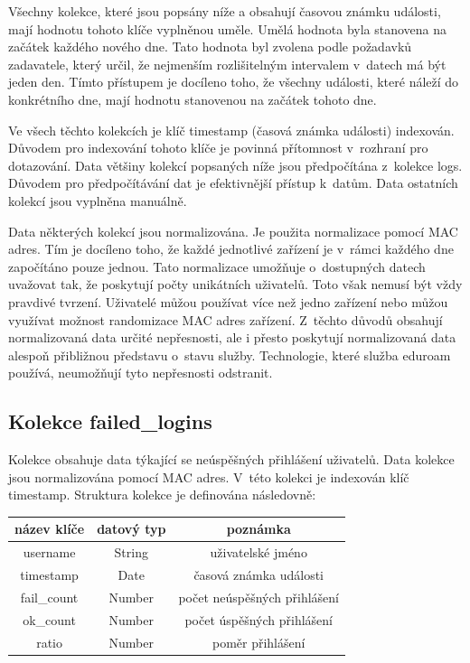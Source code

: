 \documentclass[thesis=M,czech]{FITthesis}[2012/06/26]
\begin{document}
    Všechny kolekce, které jsou popsány níže a obsahují časovou známku události,
    mají hodnotu tohoto klíče vyplněnou uměle. 
    Umělá hodnota byla stanovena na začátek každého nového dne.
    Tato hodnota byl zvolena podle požadavků zadavatele, který určil, že
    nejmenším rozlišitelným intervalem v~datech má být jeden den.
    Tímto přístupem je docíleno toho, že všechny události,
    které náleží do konkrétního dne, mají hodnotu stanovenou na začátek tohoto dne.

    Ve všech těchto kolekcích je klíč timestamp (časová známka události) indexován.
    Důvodem pro indexování tohoto klíče je povinná přítomnost v~rozhraní pro dotazování.
    Data většiny kolekcí popsaných níže jsou předpočítána z~kolekce logs.
    Důvodem pro předpočítávání dat je efektivnější přístup k~datům.
    Data ostatních kolekcí jsou vyplněna manuálně.

    Data některých kolekcí jsou normalizována.
    Je použita normalizace pomocí MAC adres.
    Tím je docíleno toho, že každé jednotlivé zařízení je v~rámci každého dne započítáno pouze jednou.
    Tato normalizace umožňuje o~dostupných datech uvažovat tak,
    že poskytují počty unikátních uživatelů.
    Toto však nemusí být vždy pravdivé tvrzení.
    Uživatelé můžou používat více než jedno zařízení
    nebo můžou využívat možnost randomizace MAC adres zařízení.
    Z~těchto důvodů obsahují normalizovaná data určité nepřesnosti,
    ale i přesto poskytují normalizovaná data alespoň přibližnou představu o~stavu služby.
    Technologie, které služba eduroam používá, neumožňují tyto nepřesnosti odstranit.

    \subsection{Kolekce failed\_logins}

      Kolekce obsahuje data týkající se neúspěšných přihlášení uživatelů.
      Data kolekce jsou normalizována pomocí MAC adres.
      V~této kolekci je indexován klíč timestamp. 
      Struktura kolekce je definována následovně:

      \begin{center}
        \begin{tabular}{ | c | c | c | }
          \hline
            název klíče & datový typ & poznámka                       \\ \hline
            username    & String     & uživatelské jméno              \\ \hline
            timestamp   & Date       & časová známka události         \\ \hline
            fail\_count & Number     & počet neúspěšných přihlášení   \\ \hline
            ok\_count   & Number     & počet úspěšných přihlášení     \\ \hline
            ratio       & Number     & poměr přihlášení               \\
          \hline
        \end{tabular}
      \end{center}
\end{document}
